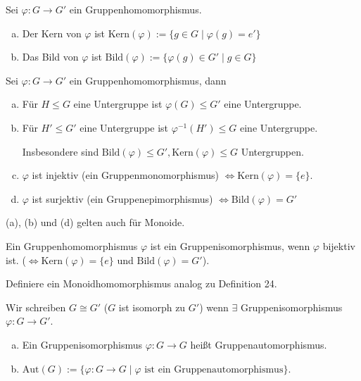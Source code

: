 \documentclass[a4paper]{report}
\begin{document}
\begin{defi}
  Sei $\varphi : G \to G'$ ein Gruppenhomomorphismus.
  \begin{enumerate}[(a)]
    \item Der Kern von $\varphi$ ist $\mathrm{Kern}(\varphi) := \{g \in G \mid \varphi(g) = e'\}$
    \item Das Bild von $\varphi$ ist $\mathrm{Bild}(\varphi) := \{\varphi(g) \in G'\mid g \in G\}$
  \end{enumerate}
\end{defi}

\begin{prop}[Übung]
  Sei $\varphi : G \to G'$ ein Gruppenhomomorphismus, dann
  \begin{enumerate}[(a)]
          \item Für $H \le G$ eine Untergruppe ist $\varphi(G) \le G'$ eine Untergruppe.
    \item Für $H' \le G'$ eine Untergruppe ist $\varphi^{-1}(H') \le G$ eine Untergruppe.

          Insbesondere sind $\mathrm{Bild}(\varphi) \le G', \mathrm{Kern}(\varphi) \le G$ Untergruppen.
    \item $\varphi$ ist injektiv (ein Gruppenmonomorphismus) $\iff \mathrm{Kern}(\varphi) = \{e\}$.
    \item $\varphi$ ist surjektiv (ein Gruppenepimorphismus) $\iff \mathrm{Bild}(\varphi) = G'$
  \end{enumerate}
  \begin{bem*}
(a), (b) und (d) gelten auch für Monoide.
  \end{bem*}
\end{prop}

\begin{defi}
Ein Gruppenhomomorphismus $\varphi$ ist ein Gruppenisomorphismus, wenn $\varphi$ bijektiv ist. ($\iff \mathrm{Kern}(\varphi) = \{e\}$ und $\mathrm{Bild}(\varphi) =G'$).
\end{defi}
\begin{bem*}[Übung]
  Definiere ein Monoidhomomorphismus analog zu Definition 24.
\end{bem*}

\begin{nota*}
  Wir schreiben $G \cong G'$ ($G$ ist isomorph zu $G'$) wenn $\exists$ Gruppenisomorphismus $\varphi : G \to G'$.
\end{nota*}

\begin{defi}
\begin{enumerate}[(a)]
  \item Ein Gruppenisomorphismus $\varphi : G \to G$ heißt Gruppenautomorphismus.
  \item $\mathrm{Aut}(G):= \{\varphi : G \to G \mid \varphi \text{ ist ein Gruppenautomorphismus}\}$.
\end{enumerate}
\end{defi}
\end{document}
